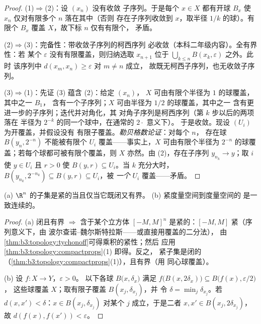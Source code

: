 \begin{proof}
(1)$\Rightarrow$(2)：设 $(x_n)$ 没有收敛
子序列。于是每个 $x \in X$ 都有开球 $B_x$
使 $x_n$ 仅对有限多个 $n$ 落在其中（否则
存在子序列收敛到 $x$，取半径 $1/k$ 的球）。有限个
$B_x$ 覆盖 $X$，故下标 $n$ 仅有有限个，
矛盾。

(2)$\Rightarrow$(3)：完备性：带收敛子序列的柯西序列
必收敛（本科二年级内容）。全有界性：若
某个 $\varepsilon$ 没有有限覆盖，则归纳选取
$x_{n+1}$ 位于 $\bigcup_{k\leq n} B(x_k, \varepsilon)$ 之外。此时
该序列中 $d(x_m, x_n) \geq \varepsilon$ 对 $m \neq n$ 成立，
故既无柯西子序列，也无收敛子序列。

(3)$\Rightarrow$(1)：先证 (3) 蕴含 (2)：给定 $(x_n)$，
$X$ 可由有限个半径为 $1$ 的球覆盖，其中之一 $B_1$，
含有一个子序列；$X$ 可由半径为 $1/2$ 的球覆盖，其中之一
含有更进一步的子序列；迭代并对角化，其
对角子序列是柯西序列（第 $k$ 步以后的两项落在
半径为 $2^{-k}$ 的同一个球中，在通常的 $2\cdot$ 意义下）。
于是收敛。现设 $(U_i)$ 为开覆盖，并假设没有
有限子覆盖。\emph{勒贝格数论证}：对每个 $n$，
存在球 $B(y_n, 2^{-n})$ 不能被有限个
$U_i$ 覆盖——事实上，$X$ 可由有限个半径为
$2^{-n}$ 的球覆盖；若每个球都可被有限个覆盖，则 $X$ 亦然。由
(2)，存在子序列 $y_{n_k} \to y$；取 $i$ 使 $y \in U_i$
且 $r > 0$ 使 $B(y, r) \subseteq U_i$。当 $k$ 充分大时，
$B(y_{n_k}, 2^{-n_k}) \subseteq B(y, r) \subseteq U_i$，被
\emph{一个} $U_i$ 覆盖——矛盾。
\end{proof}

\begin{corollary}[海涅–博雷尔；海涅]
\label{cor:b3:topology:heineborel}
(a) $\R^n$ 的子集是紧的当且仅当它既闭又有界。
(b) 紧度量空间到度量空间的
是一致连续的。
\end{corollary}

\begin{proof}
(a) 闭且有界 $\Rightarrow$ 含于某个立方体
$[-M,M]^n$ 是紧的：$[-M, M]$ 紧（序列意义下，由
波尔查诺–魏尔斯特拉斯——或直接用覆盖的二分法），
由\cref{thm:b3:topology:tychonoff}可得乘积的紧性；然后
应用 \cref{thm:b3:topology:compactprops}(1) 即得。反之，
紧子集是闭的
（\cref{thm:b3:topology:compactprops}(1)），且有界（用
同心球覆盖）。

(b) 设 $f \colon X \to Y$，$\varepsilon > 0$。
以下各球 $B\bigl(x, \delta_x\bigr)$ 满足 $f\bigl(B(x,
2\delta_x)\bigr)\subseteq B\bigl(f(x), \varepsilon/2\bigr)$，
这些球覆盖 $X$；取有限子覆盖 $B(x_j, \delta_{x_j})$，并
令 $\delta = \min_j \delta_{x_j}$。若 $d(x, x') < \delta$：$x
\in B(x_j, \delta_{x_j})$ 对某个 $j$ 成立，于是二者 $x, x'
\in B(x_j, 2\delta_{x_j})$，故 $d(f(x), f(x')) < \varepsilon$。
\end{proof}

